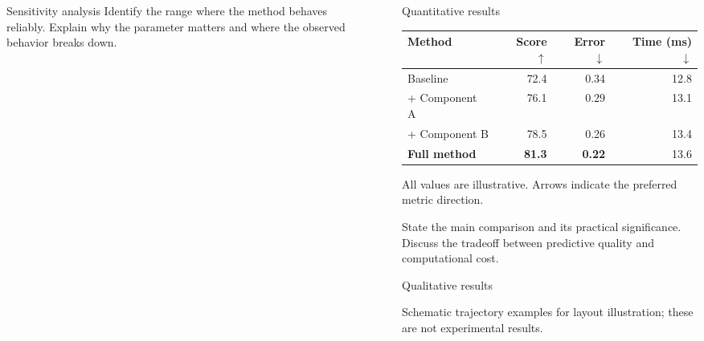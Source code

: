 \documentclass[final]{beamer}
\newlength{\sepwidth}
\newlength{\colwidth}
\newcommand{\separatorcolumn}{\begin{column}{\sepwidth}\end{column}}
\begin{document}
\begin{frame}[t]
\begin{columns}[t]
\begin{column}{\colwidth}
\begin{block}{Sensitivity analysis}
    Identify the range where the method behaves reliably. Explain why the
    parameter matters and where the observed behavior breaks down.
  \end{block}

\end{column}

\separatorcolumn
\begin{column}{\colwidth}
  \begin{exampleblock}{Quantitative results}
    \begin{center}
      \renewcommand{\arraystretch}{1.25}
      \begin{tabular}{lrrr}
        \toprule
        Method & Score $\uparrow$ & Error $\downarrow$ & Time (ms) $\downarrow$ \\
        \midrule
        Baseline & 72.4 & 0.34 & 12.8 \\
        + Component A & 76.1 & 0.29 & 13.1 \\
        + Component B & 78.5 & 0.26 & 13.4 \\
        \textbf{Full method} & \textbf{81.3} & \textbf{0.22} & 13.6 \\
        \bottomrule
      \end{tabular}
    \end{center}
    {\small All values are illustrative. Arrows indicate the preferred metric direction.}

    State the main comparison and its practical significance. Discuss the tradeoff
    between predictive quality and computational cost.
  \end{exampleblock}

  \begin{block}{Qualitative results}
    \begin{center}
      \begin{minipage}{0.31\linewidth}\end{minipage}\hfill
      \begin{minipage}{0.31\linewidth}\end{minipage}\hfill
      \begin{minipage}{0.31\linewidth}\end{minipage}
    \end{center}
    {\small Schematic trajectory examples for layout illustration; these are not experimental results.}


\end{block}
\end{column}
\end{columns}
\end{frame}
\end{document}

